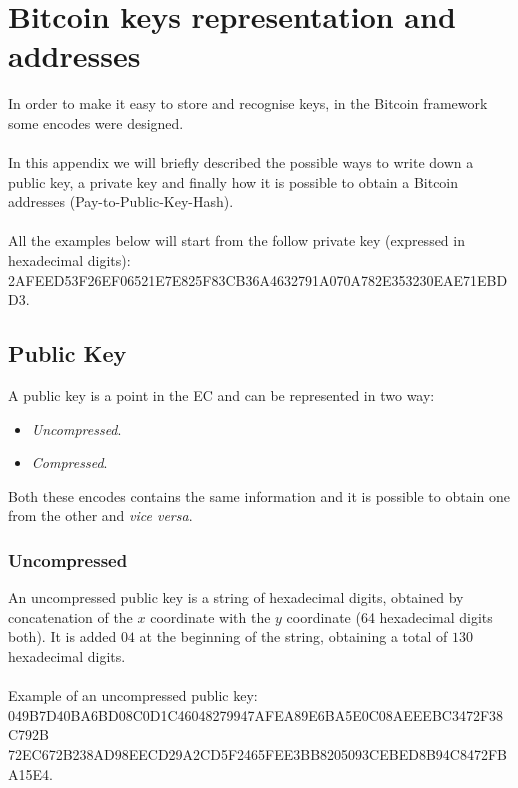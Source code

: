 
\chapter{Bitcoin keys representation and addresses}%

\label{AppendixA} %


In order to make it easy to store and recognise keys, in the Bitcoin framework some encodes were designed.
\\ \\
In this appendix we will briefly described the possible ways to write down a public key, a private key and finally how it is possible to obtain a Bitcoin addresses (Pay-to-Public-Key-Hash).
\\ \\
All the examples below will start from the follow private key (expressed in hexadecimal digits): \\
2AFEED53F26EF06521E7E825F83CB36A4632791A070A782E353230EAE71EBDD3.


\section{Public Key}
A public key is a point in the EC and can be represented in two way:
\begin{itemize}
	\item \textit{Uncompressed}.
	\item \textit{Compressed}.
\end{itemize}
 Both these encodes contains the same information and it is possible to obtain one from the other and \textit{vice versa}. 

\subsection{Uncompressed}
An uncompressed public key is a string of hexadecimal digits, obtained by concatenation of the $x$ coordinate with the $y$ coordinate (64 hexadecimal digits both). It is added $04$ at the beginning of the string, obtaining a total of $130$ hexadecimal digits. \\ \\
Example of an uncompressed public key: \\
049B7D40BA6BD08C0D1C46048279947AFEA89E6BA5E0C08AEEEBC3472F38C792B
72EC672B238AD98EECD29A2CD5F2465FEE3BB8205093CEBED8B94C8472FBA15E4.


